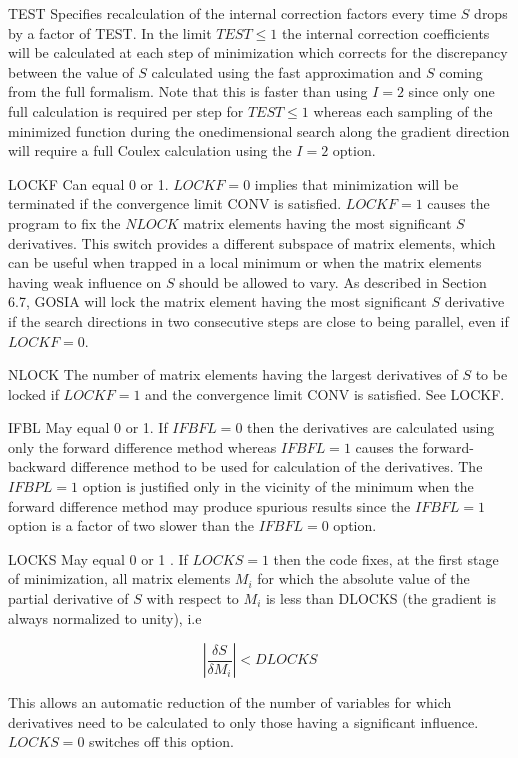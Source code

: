 \documentclass[10pt]{article}
\begin{document}
TEST Specifies recalculation of the internal correction factors every time $S$ drops by a factor of TEST. In the limit $T E S T \leq 1$ the internal correction coefficients will be calculated at each step of minimization which corrects for the discrepancy between the value of $S$ calculated using the fast approximation and $S$ coming from the full formalism. Note that this is faster than using $I=2$ since only one full calculation is required per step for $T E S T \leq 1$ whereas each sampling of the minimized function during the onedimensional search along the gradient direction will require a full Coulex calculation using the $I=2$ option.

LOCKF Can equal 0 or 1. $L O C K F=0$ implies that minimization will be terminated if the convergence limit CONV is satisfied. $L O C K F=1$ causes the program to fix the $N L O C K$ matrix elements having the most significant $S$ derivatives. This switch provides a different subspace of matrix elements, which can be useful when trapped in a local minimum or when the matrix elements having weak influence on $S$ should be allowed to vary. As described in Section 6.7, GOSIA will lock the matrix element having the most significant $S$ derivative if the search directions in two consecutive steps are close to being parallel, even if $L O C K F=0$.

NLOCK The number of matrix elements having the largest derivatives of $S$ to be locked if $L O C K F=1$ and the convergence limit CONV is satisfied. See LOCKF.

IFBL May equal 0 or 1. If $I F B F L=0$ then the derivatives are calculated using only the forward difference method whereas $I F B F L=1$ causes the forward-backward difference method to be used for calculation of the derivatives. The $I F B P L=1$ option is justified only in the vicinity of the minimum when the forward difference method may produce spurious results since the $I F B F L=1$ option is a factor of two slower than the $I F B F L=0$ option.

LOCKS May equal 0 or 1 . If $L O C K S=1$ then the code fixes, at the first stage of minimization, all matrix elements $M_{i}$ for which the absolute value of the partial derivative of $S$ with respect to $M_{i}$ is less than DLOCKS (the gradient is always normalized to unity), i.e

$$
\left|\frac{\delta S}{\delta M_{i}}\right|<D L O C K S
$$

This allows an automatic reduction of the number of variables for which derivatives need to be calculated to only those having a significant influence. $L O C K S=0$ switches off this option.
\end{document}
